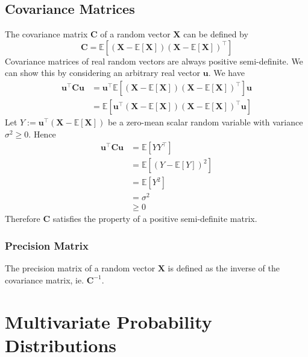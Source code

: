 \documentclass[11pt]{report} %
\begin{document}
\subsection{Covariance Matrices}
The covariance matrix $\mathbf{C}$ of a random vector $\mathbf{X}$ can be defined by
\begin{equation}
\mathbf{C} = \mathbb{E}\left[\left(\mathbf{X} - \mathbb{E}\left[\mathbf{X}\right]\right)\left(\mathbf{X} - \mathbb{E}\left[\mathbf{X}\right]\right)^{\top}\right]
\end{equation}
Covariance matrices of real random vectors are always positive semi-definite. We can show this by considering an arbitrary real vector $\mathbf{u}$. We have
\begin{align}
\mathbf{u}^{\top}\mathbf{C}\mathbf{u} &= \mathbf{u}^{\top}\mathbb{E}\left[\left(\mathbf{X} - \mathbb{E}\left[\mathbf{X}\right]\right)\left(\mathbf{X} - \mathbb{E}\left[\mathbf{X}\right]\right)^{\top}\right]\mathbf{u} \\
&= \mathbb{E}\left[\mathbf{u}^{\top}\left(\mathbf{X} - \mathbb{E}\left[\mathbf{X}\right]\right)\left(\mathbf{X} - \mathbb{E}\left[\mathbf{X}\right]\right)^{\top}\mathbf{u}\right]
\end{align}
Let $Y := \mathbf{u}^{\top}\left(\mathbf{X} - \mathbb{E}\left[\mathbf{X}\right]\right)$ be a zero-mean scalar random variable with variance $\sigma^{2} \geq 0$. Hence
\begin{align}
\mathbf{u}^{\top}\mathbf{C}\mathbf{u} &= \mathbb{E}\left[YY^{\top}\right] \\
&= \mathbb{E}\left[\left(Y - \mathbb{E}\left[Y\right]\right)^{2}\right] \\
&= \mathbb{E}\left[Y^{2}\right] \\
&= \sigma^{2} \\
&\geq 0
\end{align}
Therefore $\mathbf{C}$ satisfies the property of a positive semi-definite matrix.

\subsubsection{Precision Matrix}

The precision matrix of a random vector $\mathbf{X}$ is defined as the inverse of the covariance matrix, ie. $\mathbf{C}^{-1}$.

\section{Multivariate Probability Distributions}
\end{document}
